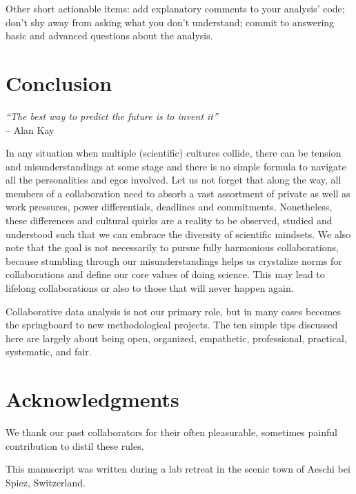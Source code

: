 \documentclass{article}
\begin{document}
Other short actionable items: add explanatory comments to your analysis’ code; don’t shy away from asking what you don’t understand; commit to answering basic and advanced questions about the analysis.

\section*{Conclusion} %

\begin{flushright}
\rightskip=1cm\textit{``The best way to predict the future is to invent it''} \\
\vspace{.2em}
\rightskip=0cm -- Alan Kay
\end{flushright}

In any situation when multiple (scientific) cultures collide, there can be tension and misunderstandings at some stage and there is no simple formula to navigate all the personalities and egos involved. Let us not forget that along the way, all members of a collaboration need to absorb a vast assortment of private as well as work pressures, power differentials, deadlines and commitments. Nonetheless, these differences and cultural quirks are a reality to be observed, studied and understood such that we can embrace the diversity of scientific mindsets. We also note that the goal is not necessarily to pursue fully harmonious collaborations, because stumbling through our misunderstandings helps us crystalize norms for collaborations and define our core values of doing science. This may lead to lifelong collaborations or also to those that will never happen again.

Collaborative data analysis is not our primary role, but in many cases becomes the springboard to new methodological projects. The ten simple tips discussed here are largely about being open, organized, empathetic, professional, practical, systematic, and fair.

\section*{Acknowledgments} %

We thank our past collaborators for their often pleasurable, sometimes painful contribution to distil these rules.

This manuscript was written during a lab retreat in the scenic town of Aeschi bei Spiez, Switzerland.
\end{document}

